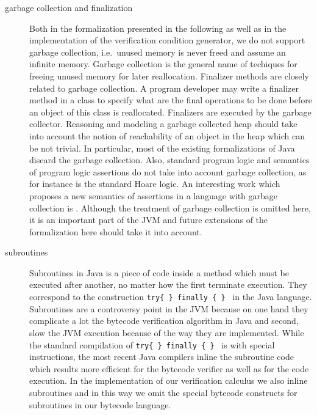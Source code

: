 \begin{description}
   \item [garbage collection and finalization]
         Both in the formalization presented in the following as well as in the implementation of the verification condition 
	 generator, we do not support garbage collection, i.e.\ unused memory is never freed and assume
	  an infinite memory. Garbage collection is the general name of techiques for freeing unused memory 
	 for later reallocation. Finalizer methods are closely related to garbage collection.
	 A program developer may write a finalizer method in a class to specify what are 
	 the final operations to be done before an object of this class is reallocated. Finalizers are executed
	 by the garbage collector. Reasoning and modeling a garbage collected heap should take into account the notion of reachability of an object in 
	 the heap which can be not trivial. In particular, most of the existing formalizations of Java discard the garbage collection. 
	 Also, standard program logic and semantics of program logic assertions do not take into account garbage collection,
	 as for instance is the  standard Hoare logic. An interesting work which proposes a new semantics of assertions in a 
	 language with garbage collection is \cite{CHB03PLE}. Although the treatment of garbage collection is  omitted here,
	 it is an important part of the JVM and future extensions of the formalization here should take it into account.
	     
   \item [subroutines] Subroutines in Java is a piece of code inside a method which must be executed 
         after another, no matter how the first terminate execution. 
	 They correspond to the construction \texttt{try\{ \} finally \{ \} } in the Java language.
	 Subroutines are a controversy point 
	 in the JVM because on one hand they complicate a lot the bytecode verification algorithm in Java and second,
	 slow the JVM execution because of the way they are implemented. While the standard compilation of  \texttt{try\{ \} finally \{ \} }
	 is with special instructions, the most recent Java compilers inline the subroutine 
	 code which results more efficient for the bytecode verifier as well as for the code execution. 
	 In the implementation of our verification calculus we also inline subroutines and in this way we omit the special bytecode constructs
	 for subroutines in our bytecode language. 
	

\end{description}
